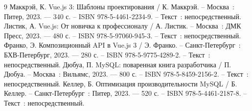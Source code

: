\begin{thebibliography}{9}
	 Маккрэй, К. Vue.js 3: Шаблоны проектирования / К. Маккрэй. – Москва~: Питер, 2023. — 340 с. – ISBN 978-5-4461-2234-9. – Текст~: непосредственный.
	 Листик, А. Vue.js: От новичка к профессионалу / А. Листик. – Москва~: ДМК Пресс, 2023. — 480 с. – ISBN 978-5-97060-945-3. – Текст~: непосредственный.
	 Франко, Э. Композиционный API в Vue.js 3 / Э. Франко. – Санкт-Петербург~: БХВ-Петербург, 2023. — 280 с. – ISBN 978-5-9775-4289-2. – Текст~: непосредственный.
	 Дюбуа, П. MySQL: поваренная книга разработчика / П. Дюбуа. – Москва~: Вильямс, 2023. — 800 с. – ISBN 978-5-8459-2156-2. – Текст~: непосредственный.
	 Келлер, Б. Оптимизация производительности MySQL / Б. Келлер. – Санкт-Петербург~: Питер, 2023. — 520 с. – ISBN 978-5-4461-2187-8. – Текст~: непосредственный.
\end{thebibliography}

